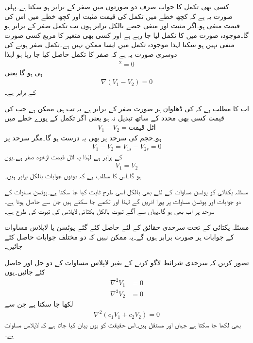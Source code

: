 کسی بھی تکمل کا جواب صرف دو صورتوں میں صفر کے برابر ہو سکتا ہے۔پہلی صورت یہ ہے کہ کچھ خطے میں تکمل کی قیمت مثبت اور کچھ خطے میں اس کی قیمت منفی ہو۔اگر مثبت اور منفی حصے بالکل برابر ہوں تب تکمل صفر کے برابر ہو گا۔موجودہ صورت میں  کا تکمل لیا جا رہے ہے اور کسی بھی متغیر کا مربع کسی صورت منفی نہیں ہو سکتا لہٰذا موجودہ تکمل میں ایسا ممکن نہیں ہے۔تکمل صفر ہونے کی دوسری صورت یہ ہے کہ صفر کا تکمل حاصل کیا جا رہا ہو لہٰذا
\begin{align*}
[\nabla(V_1-V_2)]^2 =0
\end{align*}
ہی ہو گا یعنی
\begin{align*}
\nabla (V_1-V_2)=0
\end{align*}
کے برابر ہے۔

اب  کا مطلب ہے کہ  کی ڈھلوان ہر صورت صفر کے برابر ہے۔یہ تب ہی ممکن ہے جب  کی قیمت کسی بھی محدد کے ساتھ تبدیل نہ ہو یعنی اگر تکمل کے پورے خطے میں
\begin{align*}
V_1-V_2=\textrm{اٹل قیمت}
\end{align*}
ہو۔حجم کی سرحد پر بھی یہ درست ہو گا۔مگر سرحد پر
\begin{align*}
V_1-V_2=V_{1s}-V_{2s}=0
\end{align*}
کے برابر ہے لہٰذا یہ اٹل قیمت ازخود صفر ہے۔یوں
\begin{align}
V_1=V_2
\end{align}
ہو گا۔اس کا مطلب  ہے کہ دونوں جوابات بالکل برابر ہیں۔

مسئلہ یکتائی کو پوئسن مساوات کے لئے بھی بالکل اسی طرح ثابت کیا جا سکتا ہے۔پوئسن مساوات کے دو جوابات  اور  پوئسن مساوات پر پورا اتریں گے لہٰذا  اور  لکھے جا سکتے ہیں جن سے  حاصل ہوتا ہے۔سرحد پر اب بھی  ہو گا۔یہاں سے آگے ثبوت بالکل یکتائی لاپلاس کی ثبوت کی طرح ہے۔

مسئلہ یکتائی کے تحت سرحدی حقائق کے لئے حاصل کئے  گئے پوئسن یا لاپلاس مساوات کے جوابات ہر صورت برابر ہوں گے۔یہ ممکن نہیں کہ دو مختلف جوابات حاصل کئے جائیں۔ 

تصور کریں کہ سرحدی شرائط لاگو کرنے  کے بغیر لاپلاس مساوات کے دو حل  اور  حاصل کئے جائیں۔یوں
\begin{align*}
\nabla^2 V_1&=0\\
\nabla^2 V_2&=0
\end{align*}
لکھا جا سکتا ہے جن سے
\begin{align*}
\nabla^2 (c_1 V_1 + c_2 V_2)=0 
\end{align*}
بھی لکھا جا سکتا ہے جہاں  اور  مستقل ہیں۔اس حقیقت کو یوں بیان کیا جاتا ہے کہ لاپلاس مساوات  ہے۔


